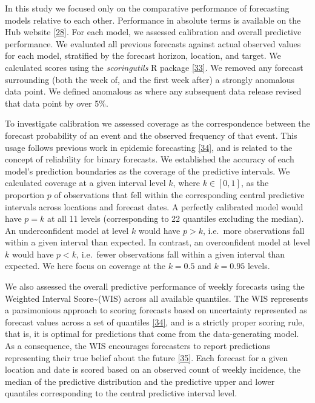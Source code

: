\documentclass[
]{article}
\begin{document}
In this study we focused only on the comparative performance of forecasting models relative to each other. Performance in absolute terms is available on the Hub website \protect\hyperlink{ref-europeancovid-19forecasthubEuropeanCovid19Forecast}{{[}28{]}}. For each model, we assessed calibration and overall predictive performance. We evaluated all previous forecasts against actual observed values for each model, stratified by the forecast horizon, location, and target. We calculated scores using the \emph{scoringutils} R package \protect\hyperlink{ref-nikosibosseScoringutilsUtilitiesScoring2020}{{[}33{]}}. We removed any forecast surrounding (both the week of, and the first week after) a strongly anomalous data point. We defined anomalous as where any subsequent data release revised that data point by over 5\%.

To investigate calibration we assessed coverage as the correspondence between the forecast probability of an event and the observed frequency of that event. This usage follows previous work in epidemic forecasting \protect\hyperlink{ref-bracherEvaluatingEpidemicForecasts2021}{{[}34{]}}, and is related to the concept of reliability for binary forecasts. We established the accuracy of each model's prediction boundaries as the coverage of the predictive intervals. We calculated coverage at a given interval level \(k\), where \(k\in[0,1]\), as the proportion \(p\) of observations that fell within the corresponding central predictive intervals across locations and forecast dates. A perfectly calibrated model would have \(p=k\) at all 11 levels (corresponding to 22 quantiles excluding the median). An underconfident model at level \(k\) would have \(p>k\), i.e.~more observations fall within a given interval than expected. In contrast, an overconfident model at level \(k\) would have \(p<k\), i.e.~fewer observations fall within a given interval than expected. We here focus on coverage at the \(k=0.5\) and \(k=0.95\) levels.

We also assessed the overall predictive performance of weekly forecasts using the Weighted Interval Score\textasciitilde(WIS) across all available quantiles. The WIS represents a parsimonious approach to scoring forecasts based on uncertainty represented as forecast values across a set of quantiles \protect\hyperlink{ref-bracherEvaluatingEpidemicForecasts2021}{{[}34{]}}, and is a strictly proper scoring rule, that is, it is optimal for predictions that come from the data-generating model. As a consequence, the WIS encourages forecasters to report predictions representing their true belief about the future \protect\hyperlink{ref-gneitingStrictlyProperScoring2007}{{[}35{]}}. Each forecast for a given location and date is scored based on an observed count of weekly incidence, the median of the predictive distribution and the predictive upper and lower quantiles corresponding to the central predictive interval level.
\end{document}
